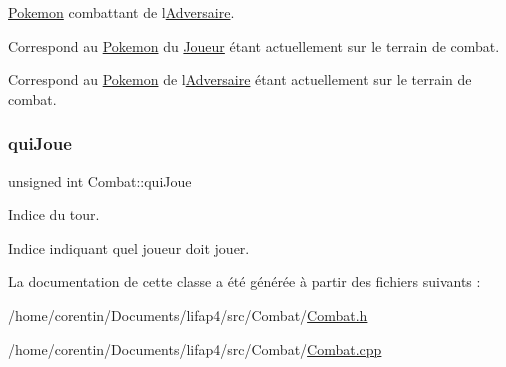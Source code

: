 \hyperlink{class_pokemon}{Pokemon} combattant de l\textquotesingle{}\hyperlink{class_adversaire}{Adversaire}.

Correspond au \hyperlink{class_pokemon}{Pokemon} du \hyperlink{class_joueur}{Joueur} étant actuellement sur le terrain de combat.

Correspond au \hyperlink{class_pokemon}{Pokemon} de l\textquotesingle{}\hyperlink{class_adversaire}{Adversaire} étant actuellement sur le terrain de combat. \mbox{\label{class_combat_a815de57c00a1b43c53ea930b74198b2c}} 
\subsubsection{\texorpdfstring{qui\+Joue}{quiJoue}}
{\footnotesize\ttfamily unsigned int Combat\+::qui\+Joue\hspace{0.3cm}{\ttfamily [private]}}



Indice du tour. 

Indice indiquant quel joueur doit jouer. 

La documentation de cette classe a été générée à partir des fichiers suivants \+:\begin{DoxyCompactItemize}
\item 
/home/corentin/\+Documents/lifap4/src/\+Combat/\hyperlink{_combat_8h}{Combat.\+h}\item 
/home/corentin/\+Documents/lifap4/src/\+Combat/\hyperlink{_combat_8cpp}{Combat.\+cpp}\end{DoxyCompactItemize}
